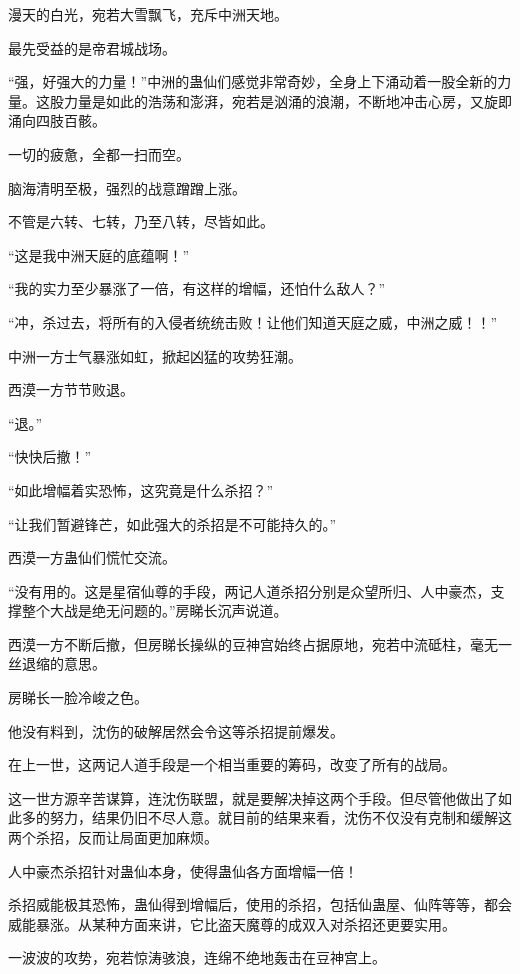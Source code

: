 
\begin{this_body}

漫天的白光，宛若大雪飘飞，充斥中洲天地。

最先受益的是帝君城战场。

“强，好强大的力量！”中洲的蛊仙们感觉非常奇妙，全身上下涌动着一股全新的力量。这股力量是如此的浩荡和澎湃，宛若是汹涌的浪潮，不断地冲击心房，又旋即涌向四肢百骸。

一切的疲惫，全都一扫而空。

脑海清明至极，强烈的战意蹭蹭上涨。

不管是六转、七转，乃至八转，尽皆如此。

“这是我中洲天庭的底蕴啊！”

“我的实力至少暴涨了一倍，有这样的增幅，还怕什么敌人？”

“冲，杀过去，将所有的入侵者统统击败！让他们知道天庭之威，中洲之威！！”

中洲一方士气暴涨如虹，掀起凶猛的攻势狂潮。

西漠一方节节败退。

“退。”

“快快后撤！”

“如此增幅着实恐怖，这究竟是什么杀招？”

“让我们暂避锋芒，如此强大的杀招是不可能持久的。”

西漠一方蛊仙们慌忙交流。

“没有用的。这是星宿仙尊的手段，两记人道杀招分别是众望所归、人中豪杰，支撑整个大战是绝无问题的。”房睇长沉声说道。

西漠一方不断后撤，但房睇长操纵的豆神宫始终占据原地，宛若中流砥柱，毫无一丝退缩的意思。

房睇长一脸冷峻之色。

他没有料到，沈伤的破解居然会令这等杀招提前爆发。

在上一世，这两记人道手段是一个相当重要的筹码，改变了所有的战局。

这一世方源辛苦谋算，连沈伤联盟，就是要解决掉这两个手段。但尽管他做出了如此多的努力，结果仍旧不尽人意。就目前的结果来看，沈伤不仅没有克制和缓解这两个杀招，反而让局面更加麻烦。

人中豪杰杀招针对蛊仙本身，使得蛊仙各方面增幅一倍！

杀招威能极其恐怖，蛊仙得到增幅后，使用的杀招，包括仙蛊屋、仙阵等等，都会威能暴涨。从某种方面来讲，它比盗天魔尊的成双入对杀招还更要实用。

一波波的攻势，宛若惊涛骇浪，连绵不绝地轰击在豆神宫上。


\end{this_body}
